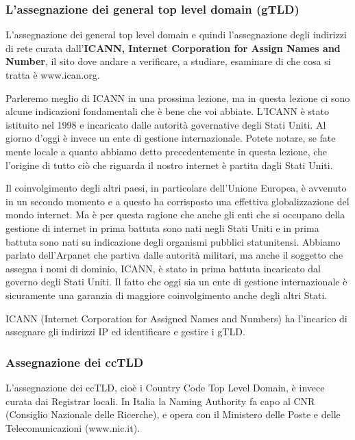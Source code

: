 \subsubsection{L'assegnazione dei general top level domain (gTLD)}

L'assegnazione dei general top level domain e quindi l'assegnazione degli indirizzi di rete curata dall'\textbf{ICANN, Internet Corporation for Assign Names and Number}, il sito dove andare a verificare, a studiare, esaminare di che cosa si tratta è www.ican.org. 

Parleremo meglio di ICANN in una prossima lezione, ma in questa lezione ci sono alcune indicazioni fondamentali che è bene che voi abbiate.
L'ICANN è stato istituito nel 1998 e incaricato dalle autorità governative degli Stati Uniti. Al giorno d'oggi è invece un ente di gestione internazionale. Potete notare, se fate mente locale a quanto abbiamo detto precedentemente in questa lezione, che l'origine di tutto ciò che riguarda il nostro internet è partita dagli Stati Uniti.

Il coinvolgimento degli altri paesi, in particolare dell'Unione Europea, è avvenuto in un secondo momento e a questo ha corrisposto una effettiva globalizzazione del mondo internet. Ma è per questa ragione che anche gli enti che si occupano della gestione di internet in prima battuta sono nati negli Stati Uniti e in prima battuta sono nati su indicazione degli organismi pubblici statunitensi. Abbiamo parlato dell'Arpanet che partiva dalle autorità militari, ma anche il soggetto che assegna i nomi di dominio, ICANN, è stato in prima battuta incaricato dal governo degli Stati Uniti. Il fatto che oggi sia un ente di gestione internazionale è sicuramente una garanzia di maggiore coinvolgimento anche degli altri Stati.

ICANN (Internet Corporation for Assigned Names and Numbers) ha l'incarico di assegnare gli indirizzi IP ed identificare e gestire i gTLD.

\subsubsection{Assegnazione dei ccTLD}

L'assegnazione dei ccTLD, cioè i Country Code Top Level Domain, è invece curata dai Registrar locali. In Italia la Naming Authority fa capo al CNR (Consiglio Nazionale delle Ricerche), e opera con il Ministero delle Poste e delle Telecomunicazioni (www.nic.it).

